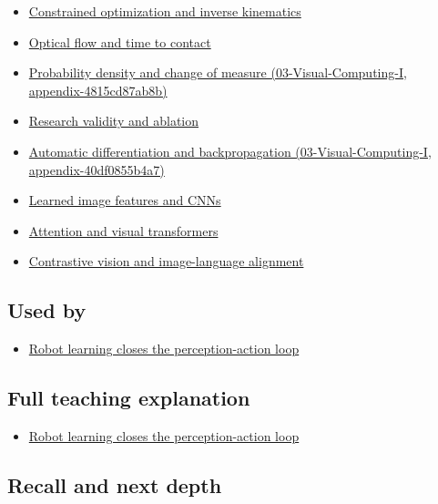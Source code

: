 \begin{itemize}
\tightlist
\item
  \hyperref[appendix-29f4bea4c2bb]{Constrained optimization and inverse kinematics}
\item
  \hyperref[appendix-e2e73f8cd93e]{Optical flow and time to contact}
\item
  \href{../03-Visual-Computing-I/main.pdf\#nameddest=appendix-4815cd87ab8b}{Probability density and change of measure (03-Visual-Computing-I, appendix-4815cd87ab8b)}
\item
  \hyperref[appendix-65788587ef78]{Research validity and ablation}
\item
  \href{../03-Visual-Computing-I/main.pdf\#nameddest=appendix-40df0855b4a7}{Automatic differentiation and backpropagation (03-Visual-Computing-I, appendix-40df0855b4a7)}
\item
  \hyperref[appendix-47c51ea026fb]{Learned image features and CNNs}
\item
  \hyperref[appendix-a9d5dfdd164a]{Attention and visual transformers}
\item
  \hyperref[appendix-772f1fd96148]{Contrastive vision and image-language alignment}
\end{itemize}

\subsection{Used by}\label{appendix-b0c42da325f1-used-by}

\begin{itemize}
\tightlist
\item
  \hyperref[04-visual-computing-ii-ch034-robot-learning-closes-the-perception-action-loop]{Robot learning closes the perception-action loop}
\end{itemize}

\subsection{Full teaching explanation}\label{appendix-b0c42da325f1-full-teaching-explanation}

\begin{itemize}
\tightlist
\item
  \hyperref[04-visual-computing-ii-ch034-robot-learning-closes-the-perception-action-loop]{Robot learning closes the perception-action loop}
\end{itemize}

\subsection{Recall and next depth}\label{appendix-b0c42da325f1-recall-and-next-depth}

